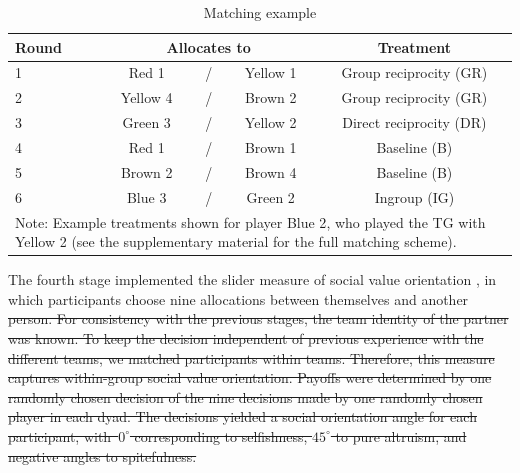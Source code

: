 \documentclass[12pt,a4paper]{article}\usepackage[]{graphicx}\usepackage[]{color}
\providecommand{\DIFdeltex}[1]{{\protect\color{red}\sout{#1}}}                      %
\providecommand{\DIFdelbegin}{} %
\providecommand{\DIFdel}[1]{\texorpdfstring{\DIFdeltex{#1}}{}} %
\begin{document}
\begin{table}
  \caption{Matching example}\label{tab:example}
  \begin{center}
    \begin{tabular}{lcccc}
    \toprule
    Round	&	\multicolumn{3}{c}{Allocates to}		&	Treatment	\\
    \midrule
    1	&	\color{red}Red 1	&	/	&	\color{yellow!80!black}Yellow 1	&	Group reciprocity (GR)	\\
    2	&	\color{yellow!80!black}Yellow 4	&	/	&	\color{brown}Brown 2	&	Group reciprocity (GR)	\\
    3	&	\color{green!60!black}Green 3	&	/	&	\color{yellow!80!black}Yellow 2	&	Direct reciprocity (DR)	\\
    4	&	\color{red}Red 1	&	/	&	\color{brown}Brown 1	&	Baseline (B)	\\
    5	&	\color{brown}Brown 2	&	/	&	\color{brown}Brown 4	&	Baseline (B)	\\
    6	&	\color{blue}Blue 3	&	/	&	\color{green!60!black}Green 2	&	Ingroup (IG)	\\
    \bottomrule
    \multicolumn{5}{p{0.7\textwidth}}{\footnotesize
	Note: Example treatments shown for player {\color{blue}Blue 2}, who played the TG with {\color{yellow!80!black}Yellow 2} (see the supplementary material for the full matching scheme).    
    }
    \end{tabular}
  \end{center}
\end{table}

The fourth stage implemented the slider measure of social value orientation
\citep*{murphy2011measuring,crosetto2012flexible}, in which participants
choose nine allocations between themselves and another \DIFdelbegin \DIFdel{person. For
consistency with the previous stages, the team identity of the partner
was known.
To keep the decision independent of previous experience
with the different teams, we matched participants within teams. Therefore, this measure captures within-group social value orientation. Payoffs
were determined by one randomly chosen decision of the nine decisions
made by one randomly chosen player in each dyad. The decisions yielded
a social orientation angle for each participant, with~$0^{\circ}$
corresponding to selfishness, $45^{\circ}$ to pure altruism, and
negative angles to spitefulness.
}%
\end{document}
